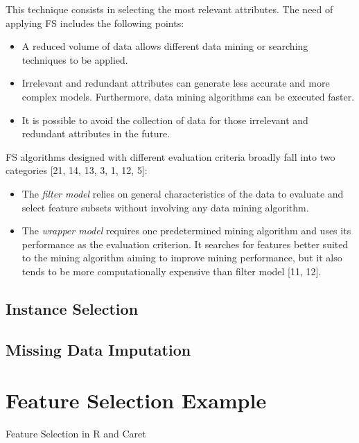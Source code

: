\documentclass[
]{book}
\begin{document}
This technique consists in selecting the most relevant attributes. The need of applying FS includes the following points:

\begin{itemize}
\item
  A reduced volume of data allows different data mining or searching techniques to be applied.
\item
  Irrelevant and redundant attributes can generate less accurate and more complex models. Furthermore, data mining algorithms can be executed faster.
\item
  It is possible to avoid the collection of data for those irrelevant and redundant attributes in the future.
\end{itemize}

FS algorithms designed with different evaluation criteria broadly fall into two categories {[}21, 14, 13, 3, 1, 12, 5{]}:

\begin{itemize}
\item
  The \emph{filter model} relies on general characteristics of the data to evaluate and select feature subsets without involving any data mining algorithm.
\item
  The \emph{wrapper model} requires one predetermined mining algorithm and uses its performance as the evaluation criterion. It searches for features better suited to the mining algorithm aiming to improve mining performance, but it also tends to be more computationally expensive than filter model {[}11, 12{]}.
\end{itemize}

\hypertarget{instance-selection}{%
\section{Instance Selection}\label{instance-selection}}

\hypertarget{missing-data-imputation}{%
\section{Missing Data Imputation}\label{missing-data-imputation}}

\hypertarget{feature-selection-example}{%
\chapter{Feature Selection Example}\label{feature-selection-example}}

Feature Selection in R and Caret
\end{document}
